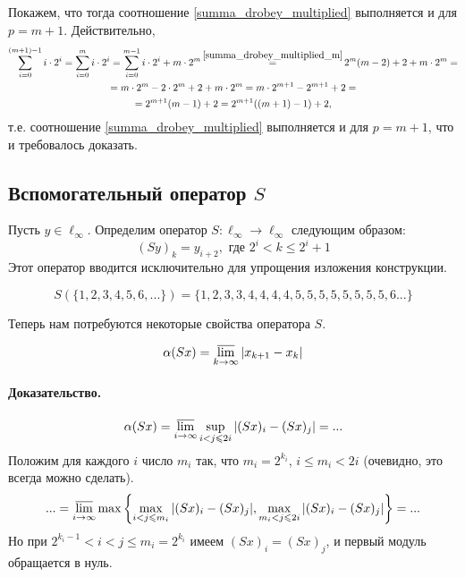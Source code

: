 Покажем, что тогда соотношение \eqref{summa_drobey_multiplied} выполняется и для $p=m+1$.
Действительно,
\begin{multline}
	\sum_{i=0}^{(m+1)-1} i \cdot 2^i
	=
	\sum_{i=0}^{m} i \cdot 2^i
	=
	\sum_{i=0}^{m - 1} i \cdot 2^i + m\cdot 2 ^m
	\mathop{=}^{\eqref{summa_drobey_multiplied_m}}
	2^m(m-2) + 2 + m\cdot 2 ^m
	=
	\\=
	m\cdot2^m-2\cdot2^m  + 2 + m\cdot 2 ^m
	=
	m\cdot2^{m+1}-2^{m+1}  + 2
	=
	\\=
	2^{m+1}(m-1)  + 2
	=
	2^{m+1}((m+1)-1)  + 2
	,
\end{multline}
т.е. соотношение \eqref{summa_drobey_multiplied} выполняется и для $p=m+1$,
что и требовалось доказать.



\subsection{Вспомогательный оператор $S$}
Пусть $y\in \ell_\infty$.
Определим оператор $S:\ell_\infty \to \ell_\infty$ следующим образом:
\begin{equation}\label{operator_S}
	(Sy)_k = y_{i+2}, \mbox{ где } 2^i < k \leq 2^i+1
\end{equation}
Этот оператор вводится исключительно для упрощения изложения конструкции.

\begin{example}
	$$
		S(\{1,2,3,4,5,6, ...\}) = \{1,2,3,3,4,4,4,4,5,5,5,5,5,5,5,5,6...\}
	$$
\end{example}

Теперь нам потребуются некоторые свойства оператора $S$.

\begin{lemma}
	\label{thm:alpha_S}
	\begin{equation}\label{alpha_S}
		\alpha(Sx) = \varlimsup_{k\to\infty} |x_{k+1} - x_{k}|
	\end{equation}
\end{lemma}

\paragraph{Доказательство.}

\begin{equation*}
	\alpha(Sx) =
	\varlimsup_{i\to\infty} \sup_{i < j \leq 2i} | (Sx)_i - (Sx)_j | = ...
\end{equation*}
Положим для каждого $i$ число $m_i$ так,
что $m_i = 2^{k_i}$, $i \leq m_i < 2i$
(очевидно, это всегда можно сделать).
\begin{equation*}
	... =
	\varlimsup_{i\to\infty} \max \left\{
		\max_{i   < j \leq m_i} | (Sx)_i - (Sx)_j |,
		\max_{m_i < j \leq 2i } | (Sx)_i - (Sx)_j |
	\right\} =
	...
\end{equation*}
Но при $2^{k_i - 1} < i < j \leq m_i = 2^{k_i}$
имеем $(Sx)_i = (Sx)_j$, и первый модуль обращается в нуль.

